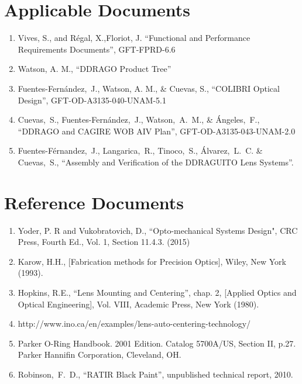 \documentclass{report}
\begin{document}
\section*{Applicable Documents}

\begin{enumerate}[label={AD\arabic*}]
\item \label{FPRD} Vives, S., and R\'egal, X.,Floriot, J. “Functional and Performance Requirements Documents”, GFT-FPRD-6.6
\item \label{product-tree} Watson, A. M., “DDRAGO Product Tree”
\item \label{optics} Fuentes-Fernández,~J., Watson, A. M., \& Cuevas, S., “COLIBRI Optical Design”, GFT-OD-A3135-040-UNAM-5.1
\item \label{aiv} Cuevas,~S., Fuentes-Fernández,~J., Watson,~A.~M., \& Ángeles,~F., “DDRAGO and CAGIRE WOB AIV Plan”, GFT-OD-A3135-043-UNAM-2.0
\item \label{aivDDRAGUITO} Fuentes-Férnandez,~J., Langarica,~R., Tinoco,~S., Álvarez,~L.~C. \& Cuevas,~S., ``Assembly and Verification of the DDRAGUITO Lens Systems''.
\end{enumerate}

\section*{Reference Documents}

\begin{enumerate}[label={RD\arabic*}]
\item \label{yoder15} Yoder, P. R and Vukobratovich, D., ``Opto-mechanical Systems Design", CRC Press, Fourth Ed., Vol. 1, Section 11.4.3. (2015)

\item \label{karow} Karow, H.H., [Fabrication methods for Precision Optics], Wiley, New York (1993).

\item \label{hopkins} Hopkins, R.E., “Lens Mounting and Centering”, chap. 2, [Applied Optics and Optical Engineering], Vol. VIII, Academic Press, New York (1980).
\item \label{ino} http://www.ino.ca/en/examples/lens-auto-centering-technology/

\item \label{parker} Parker O-Ring Handbook. 2001 Edition. Catalog 5700A/US, Section II, p.27.
Parker Hannifin Corporation, Cleveland, OH.

\item \label{black} Robinson,~F.~D., “RATIR Black Paint”, unpublished technical report, 2010.

\end{enumerate}
\end{document}
